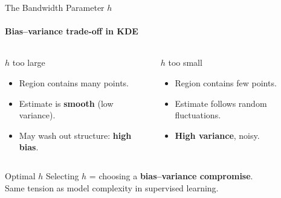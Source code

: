 \begin{frame}{The Bandwidth Parameter $h$}
  \framesubtitle{Bias–variance trade-off in KDE}
  \begin{columns}[T]
      \begin{alertblock}{$h$ too large}
        \begin{itemize}
          \item Region contains many points.
          \item Estimate is \textbf{smooth} (low variance).
          \item May wash out structure: \textbf{high bias}.
        \end{itemize}
      \end{alertblock}
      \begin{alertblock}{$h$ too small}
        \begin{itemize}
          \item Region contains few points.
          \item Estimate follows random fluctuations.
          \item \textbf{High variance}, noisy.
        \end{itemize}
      \end{alertblock}
  \end{columns}
  \bigskip
  \begin{block}{Optimal $h$}
    Selecting $h$ = choosing a \textbf{bias–variance compromise}.\\
    Same tension as model complexity in supervised learning.
  \end{block}
\end{frame}

